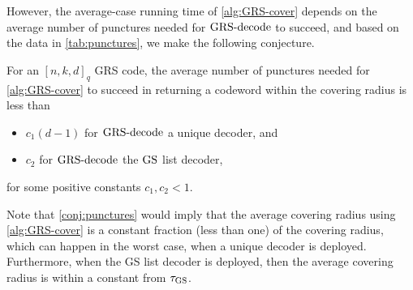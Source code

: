 \documentclass[conference]{IEEEtran}
\begin{document}
However, the average-case running time of \autoref{alg:GRS-cover} depends on the average number of punctures needed for $\operatorname{GRS-decode}$ to succeed, %
and based on the data in \autoref{tab:punctures}, we make the following conjecture. 


\begin{conjecture}
    \label{conj:punctures}
    For an $[n, k, d]_{q}$ GRS code, the average number of punctures needed for \autoref{alg:GRS-cover} to succeed in returning a codeword within the covering radius is less than 
    \begin{itemize}
        \item $c_{1} (d - 1)$ for $\operatorname{GRS-decode}$ a unique decoder, and 
        \item $c_{2}$ for $\operatorname{GRS-decode}$ the $\operatorname{GS}$ list decoder, 
    \end{itemize}
    for some positive constants $c_{1}, c_2 <1$. 
\end{conjecture}

Note that \autoref{conj:punctures} would imply that the average covering radius using \autoref{alg:GRS-cover} is a constant fraction (less than one) of the covering radius, which can happen in the worst case, when a unique decoder is deployed. Furthermore, when the GS list decoder is deployed, then the average covering radius is within a constant from $\tau_{\operatorname{GS}}$. 


\end{document}
